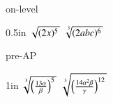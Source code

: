 \begin{taggedblock}{on-level}
    \begin{myProblems2}{}{0.5in}
        {
            $\myRoot{(2x)^5}$ 
        }
        {
            $\myRoot[3]{(2abc)^6}$ 
        }
    \end{myProblems2}
\end{taggedblock}
\begin{taggedblock}{pre-AP}
    \begin{myProblems2}{}{1in}
        {
            \Large $\myRoot[3]{ \left( \frac{13\alpha}{\beta} \right)^5 }$ 
        }
        {
            \Large $\myRoot[3]{ \left( \frac{14\alpha^2\beta}{\gamma} \right)^{12} }$ 
        }
    \end{myProblems2}
\end{taggedblock}
